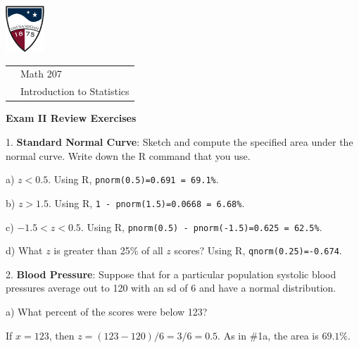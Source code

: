 \documentclass[10pt]{article}
\begin{document}
\vfill
\eject


\href{http://www.su.edu}{\includegraphics[height=1.75cm]{sulogo.eps}}
\vspace{-1.69cm}

\hfill {\small
\begin{tabular}{cl}
& Math 207\\
& Introduction to Statistics\\
\end{tabular}
}
\bigskip

\begin{center}
\textbf{\large  Exam II Review Exercises}
\end{center}
\medskip

1. \textbf{Standard Normal Curve}:  Sketch and compute the specified area under the normal curve. 
Write down the R command that you use.

\hspace{10pt} a) $z < 0.5$.
{\color{blue}Using R, \texttt{pnorm(0.5)=0.691 = 69.1\%}.}
\vspace{.4in}

\hspace{10pt} b) $z > 1.5$.
{\color{blue}Using R, \texttt{1 - pnorm(1.5)=0.0668 = 6.68\%}.}
\vspace{.5in}

\hspace{10pt} c) $-1.5< z < 0.5$.
{\color{blue}Using R, \texttt{pnorm(0.5) - pnorm(-1.5)=0.625 = 62.5\%}.}
\vspace{.5in}

\hspace{10pt} d) What $z$ is greater than 25\% of all $z$ scores?
{\color{blue}Using R, \texttt{qnorm(0.25)=-0.674}.}
\vspace{.5in}

2. \textbf{Blood Pressure}:  Suppose that for a particular population
systolic blood pressures average out to 120 with an sd of 6 and have
a normal distribution.

\hspace{10pt} a) What percent of the scores were below 123?

{\color{blue} If $x=123$, then $z=(123-120)/6=3/6=0.5$.  As in \#1a, the area is $69.1$\%.}
\vspace{0.8in}
\end{document}
